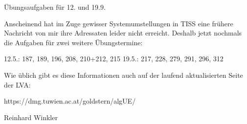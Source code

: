 Übungsaufgaben für 12. und 19.9.

Anscheinend hat im Zuge gewisser Systemumstellungen in TISS eine frühere Nachricht von mir ihre Adressaten leider nicht erreicht. Deshalb jetzt nochmals die Aufgaben für zwei weitere Übungstermine:

12.5.: 187, 189, 196, 208, 210+212, 215
19.5.: 217, 228, 279, 291, 296, 312

Wie üblich gibt es diese Informationen auch auf der laufend aktualisierten Seite der LVA:

https://dmg.tuwien.ac.at/goldstern/algUE/

Reinhard Winkler

